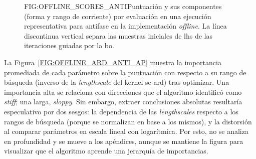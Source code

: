 \begin{figure}[Puntuación y sus componentes por evaluación en una ejecución representativa de la \acl{bo} \textit{offline} en antifase]{FIG:OFFLINE_SCORES_ANTI}{Puntuación y sus componentes (forma y rango de corriente) por evaluación en una ejecución representativa para antifase en la implementación \textit{offline}. La línea discontinua vertical separa las muestras iniciales de \ac{lhs} de las iteraciones guiadas por la \ac{bo}.}
\end{figure}

La Figura~\ref{FIG:OFFLINE_ARD_ANTI_AP} muestra la importancia promediada de cada parámetro sobre la puntuación con respecto a su rango de búsqueda (inverso de la \textit{lengthscale} del kernel \ac{se}-\ac{ard}) tras optimizar. Una importancia alta se relaciona con direcciones que el algoritmo identificó como \textit{stiff}; una larga, \textit{sloppy}. Sin embargo, extraer conclusiones absolutas resultaría especulativo por dos sesgos: la dependencia de las \textit{lengthscales} respecto a los rangos de búsqueda (porque se normalizan en base a los mismos), y la distorsión al comparar parámetros en escala lineal con logarítmica. Por esto, no se analiza en profundidad y se mueve a los apéndices, aunque se mantiene la figura para visualizar que el algoritmo aprende una jerarquía de importancias.

